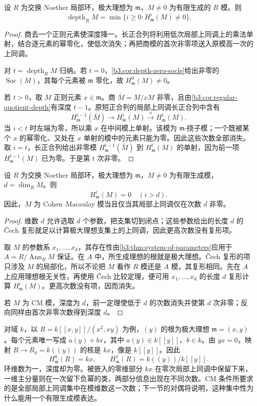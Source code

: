 \begin{theorem}\label{b3:thm:depth-local-cohomology}
	设 \(R\) 为交换 Noether 局部环，极大理想为 \(\mathfrak m\)，\(M\ne0\) 为有限生成的 \(R\) 模。则
	\[
		\operatorname{depth}_R M =\min\{i\ge0:H_{\mathfrak m}^i(M)\ne0\}.
	\]
\end{theorem}
\begin{proof}
	商去一个正则元素使深度降一。长正合列将利用低次局部上同调上的乘法单射，结合逐元素的幂零化，使低次消失；再把商模的首次非零项送入原模高一次的上同调。

	对 \(t=\operatorname{depth}_R M\) 归纳。若 \(t=0\)，\cref{b3:cor:depth-zero-socle}给出非零的 \(\operatorname{Soc}(M)\)，其每个元素被 \(\mathfrak m\) 零化，故 \(H_{\mathfrak m}^0(M)\ne0\)。

	若 \(t>0\)，取 \(M\) 正则元素 \(x\in\mathfrak m\)。商 \(\bar M=M/xM\) 非零，且由\cref{b3:cor:regular-quotient-depth}有深度 \(t-1\)。原短正合列的局部上同调长正合列中含有
	\[
		H_{\mathfrak m}^{i-1}(\bar M)\longrightarrow H_{\mathfrak m}^i(M)\xrightarrow{x}H_{\mathfrak m}^i(M).
	\]
	当 \(i<t\) 时左端为零，所以乘 \(x\) 在中间模上单射。该模为 \(\mathfrak m\)-挠子模；一个既被某个 \(x\) 的幂零化、又处在 \(x\) 单射的模中的元素只能为零。因此这些次数全部消失。取 \(i=t\)，长正合列给出非零模 \(H_{\mathfrak m}^{t-1}(\bar M)\) 到 \(H_{\mathfrak m}^t(M)\) 的单射，因为前一项 \(H_{\mathfrak m}^{t-1}(M)\) 已为零。于是第 \(t\) 次非零。
\end{proof}

\begin{theorem}\label{b3:thm:local-cohomology-dimension-vanishing}
	设 \(R\) 为交换 Noether 局部环，极大理想为 \(\mathfrak m\)，\(M\ne0\) 为有限生成模，\(d=\dim_RM\)。则
	\[
		H_{\mathfrak m}^i(M)=0\quad(i>d).
	\]
	因此，\(M\) 为 Cohen--Macaulay 模当且仅当其局部上同调仅在次数 \(d\) 非零。
\end{theorem}
\begin{proof}
	维数 \(d\) 允许选取 \(d\) 个参数，把支集切到闭点；这些参数给出的长度 \(d\) 的 Čech 复形就足以计算极大理想支集上的上同调，因此更高次数没有复形项。

	取 \(M\) 的参数系 \(x_1,\ldots,x_d\)，其存在性由\cref{b3:thm:system-of-parameters}应用于 \(A=R/\operatorname{Ann}_RM\) 保证。在 \(A\) 中，所生成理想的根就是极大理想。Čech 复形的项只涉及 \(M\) 的局部化，所以不论把 \(M\) 看作 \(R\) 模还是 \(A\) 模，其复形相同。先在 \(A\) 上应用理想根无关性，再使用 Čech 比较定理，便可用 \(x_1,\ldots,x_d\) 的长度 \(d\) 复形计算 \(H_{\mathfrak m}^i(M)\)。更高次数没有项，因而消失。

	若 \(M\) 为 CM 模，深度为 \(d\)，前一定理使低于 \(d\) 的次数消失并使第 \(d\) 次非零；反向同样由首次非零次数得到深度 \(d\)。
\end{proof}

对域 \(k\)，以 \(R=k[\![x,y]\!]/(x^2,xy)\) 为例，\((y)\) 的根为极大理想 \(\mathfrak m=(x,y)\)。每个元素唯一写成 \(a(y)+bx\)，其中 \(a(y)\in k[\![y]\!]\)、\(b\in k\)。由 \(yx=0\)，映射 \(R\to R_y=k(\!(y)\!)\) 的核是 \(kx\)，像是 \(k[\![y]\!]\)。因此
\[
	H_{\mathfrak m}^0(R)=kx,\qquad H_{\mathfrak m}^1(R)=k(\!(y)\!)/k[\![y]\!].
\]
环维数为一，深度却为零。被嵌入的零维部分 \(kx\) 在零次局部上同调中保留下来，一维主分量则在一次留下负幂的类，两部分信息出现在不同次数。CM 条件所要求的是全部局部上同调集中在模维数这一次数；下一节的对偶将说明，这种集中性为什么能用一个有限生成模表达。
